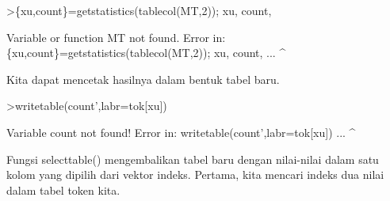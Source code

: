 \documentclass[a4paper,10pt]{article}
\begin{document}
\begin{eulernotebook}
\begin{eulerprompt}
>\{xu,count\}=getstatistics(tablecol(MT,2)); xu, count,
\end{eulerprompt}
\begin{euleroutput}
  Variable or function MT not found.
  Error in:
  \{xu,count\}=getstatistics(tablecol(MT,2)); xu, count, ...
                                      ^
\end{euleroutput}
\begin{eulercomment}
Kita dapat mencetak hasilnya dalam bentuk tabel baru.
\end{eulercomment}
\begin{eulerprompt}
>writetable(count',labr=tok[xu])
\end{eulerprompt}
\begin{euleroutput}
  Variable count not found!
  Error in:
  writetable(count',labr=tok[xu]) ...
                   ^
\end{euleroutput}
\begin{eulercomment}
Fungsi selecttable() mengembalikan tabel baru dengan nilai-nilai dalam
satu kolom yang dipilih dari vektor indeks. Pertama, kita mencari
indeks dua nilai dalam tabel token kita.


\end{eulercomment}
\end{eulernotebook}
\end{document}
